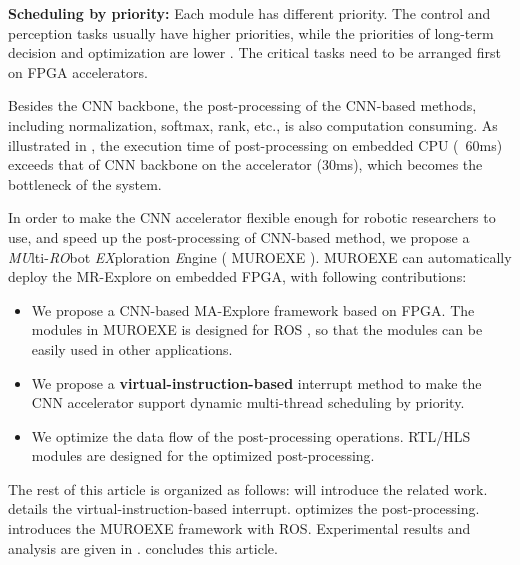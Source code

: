 \textbf{Scheduling by priority:} Each module has different priority. The control and perception tasks usually have higher priorities, while the priorities of long-term decision and optimization are lower \cite{RamsauerKLM17}. The critical tasks need to be arranged first on FPGA accelerators.

Besides the CNN backbone, the post-processing of the CNN-based methods, including normalization, softmax, rank, etc., is also computation consuming. As illustrated in , the execution time of post-processing on embedded CPU (~60ms) exceeds that of CNN backbone on the accelerator (30ms), which becomes the bottleneck of the system.


In order to make the CNN accelerator flexible enough for robotic researchers to use, and speed up the post-processing of CNN-based method, we propose a \textit{MU}lti-\textit{RO}bot \textit{EX}ploration \textit{E}ngine ( MUROEXE ). MUROEXE can automatically deploy the MR-Explore on embedded FPGA, with following contributions:

\begin{itemize}
\item We propose a CNN-based MA-Explore framework based on FPGA. The modules in MUROEXE is designed for ROS \cite{quigley2009ros}, so that the modules can be easily used in other applications.
\item We propose a \textbf{virtual-instruction-based} interrupt method to make the CNN accelerator support dynamic multi-thread scheduling by priority.
\item We optimize the data flow of the post-processing operations. RTL/HLS modules are designed for the optimized post-processing.
\end{itemize}

The rest of this article is organized as follows:  will introduce the related work.  details the {virtual-instruction-based} interrupt.  optimizes the post-processing.  introduces the MUROEXE framework with ROS. Experimental results and analysis are given in .  concludes this article.